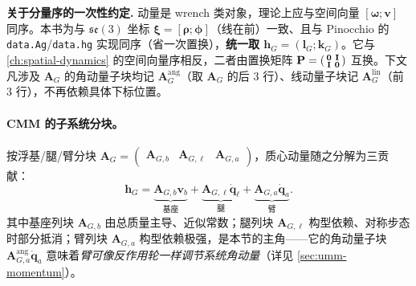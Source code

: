 \begin{note}
\textbf{关于分量序的一次性约定.}\;
动量是 wrench 类对象，理论上应与空间向量 $[\boldsymbol\omega;\mathbf v]$ 同序。本书为与 $\mathfrak{se}(3)$ 坐标 $\boldsymbol\xi=[\boldsymbol\rho;\boldsymbol\phi]$（线在前）一致、且与 Pinocchio 的 \texttt{data.Ag}/\allowbreak\texttt{data.hg} 实现同序（省一次置换），\textbf{统一取 $\mathbf h_G=(\mathbf l_G;\mathbf k_G)$}。它与 \cref{ch:spatial-dynamics} 的空间向量序相反，二者由置换矩阵 $\mathbf P=\begin{psmallmatrix}\mathbf 0&\mathbf I\\ \mathbf I&\mathbf 0\end{psmallmatrix}$ 互换。下文凡涉及 $\mathbf A_G$ 的角动量子块均记 $\mathbf A_G^{\text{ang}}$（取 $\mathbf A_G$ 的后 $3$ 行）、线动量子块记 $\mathbf A_G^{\text{lin}}$（前 $3$ 行），不再依赖具体下标位置。
\end{note}

\paragraph{CMM 的子系统分块。}
按浮基/腿/臂分块 $\mathbf A_G=\begin{pmatrix}\mathbf A_{G,b} & \mathbf A_{G,\ell} & \mathbf A_{G,a}\end{pmatrix}$，质心动量随之分解为三贡献：
\begin{equation}
  \mathbf h_G=\underbrace{\mathbf A_{G,b}\mathbf v_b}_{\text{基座}}+\underbrace{\mathbf A_{G,\ell}\dot{\mathbf q}_\ell}_{\text{腿}}+\underbrace{\mathbf A_{G,a}\dot{\mathbf q}_a}_{\text{臂}}.
  \label{eq:umm-hG-decomp}
\end{equation}
其中基座列块 $\mathbf A_{G,b}$ 由总质量主导、近似常数；腿列块 $\mathbf A_{G,\ell}$ 构型依赖、对称步态时部分抵消；臂列块 $\mathbf A_{G,a}$ 构型依赖极强，是本节的主角——它的角动量子块 $\mathbf A_{G,a}^{\text{ang}}\dot{\mathbf q}_a$ 意味着\emph{臂可像反作用轮一样调节系统角动量}（详见 \cref{sec:umm-momentum}）。

